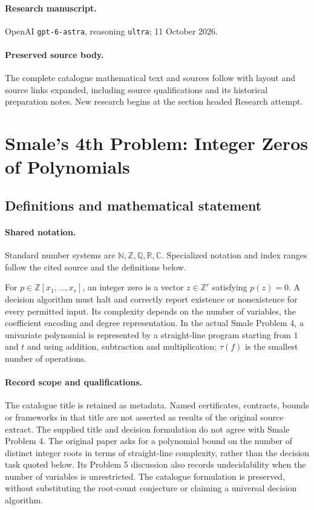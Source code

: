 \documentclass[11pt]{article}
\begin{document}
\paragraph{Research manuscript.} OpenAI \texttt{gpt-6-astra}, reasoning \texttt{ultra}; 11 October 2026.
\paragraph{Preserved source body.} The complete catalogue mathematical text and sources follow with layout and source links expanded, including source qualifications and its historical preparation notes. New research begins at the section headed Research attempt.

\section{Smale's 4th Problem: Integer Zeros of Polynomials}\label{statement}

\subsection{Definitions and mathematical statement}

\paragraph{Shared notation.}Standard number systems are $\mathbb N,\mathbb Z,\mathbb Q,\mathbb R,\mathbb C$. Specialized notation and index ranges follow the cited source and the definitions below.


For $p\in\mathbb Z[x_1,\ldots,x_r]$, an integer zero is a vector $z\in\mathbb Z^r$ satisfying $p(z)=0$. A decision algorithm must halt and correctly report existence or nonexistence for every permitted input. Its complexity depends on the number of variables, the coefficient encoding and degree representation. In the actual Smale Problem 4, a univariate polynomial is represented by a straight-line program starting from $1$ and $t$ and using addition, subtraction and multiplication; $\tau(f)$ is the smallest number of operations.
\paragraph{Record scope and qualifications.}
The catalogue title is retained as metadata. Named certificates, contracts, bounds or frameworks in that title are not asserted as results of the original source extract.
The supplied title and decision formulation do not agree with Smale Problem 4. The original paper asks for a polynomial bound on the number of distinct integer roots in terms of straight-line complexity, rather than the decision task quoted below. Its Problem 5 discussion also records undecidability when the number of variables is unrestricted. The catalogue formulation is preserved, without substituting the root-count conjecture or claiming a universal decision algorithm.
\end{document}
